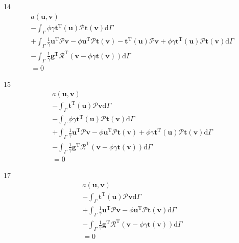 \documentclass[a4paper,12pt]{article}
\begin{document}
14
\begin{equation}
\begin{split}
a(\mathbf{u},\mathbf{v})
\\-
\int_\Gamma
\phi\gamma\mathbf{t}^{\textrm{T}}(\mathbf{u})\mathcal{P}\mathbf{t}(\mathbf{v})
\textrm{d}\Gamma
\\+
\int_\Gamma
\frac{1}{\gamma}
\mathbf{u}^\textrm{T}\mathcal{P}\mathbf{v}
-
\phi\mathbf{u}^\textrm{T}\mathcal{P}\mathbf{t}(\mathbf{v})
-
\mathbf{t}^\textrm{T}(\mathbf{u})\mathcal{P}\mathbf{v}
+
\phi\gamma\mathbf{t}^\textrm{T}(\mathbf{u})\mathcal{P}\mathbf{t}(\mathbf{v})
\textrm{d}\Gamma
\\-
\int_\Gamma
\frac{1}{\gamma}
\mathbf{g}^\textrm{T}\mathcal{R}^\textrm{T}
(\mathbf{v}-\phi\gamma\mathbf{t}(\mathbf{v}))
\textrm{d}\Gamma
\\=
0
\end{split}
\end{equation}

15
\begin{equation}
\begin{split}
a(\mathbf{u},\mathbf{v})
\\-
\int_\Gamma
\mathbf{t}^\textrm{T}(\mathbf{u})\mathcal{P}\mathbf{v}
\textrm{d}\Gamma
\\-
\int_\Gamma
\phi\gamma\mathbf{t}^{\textrm{T}}(\mathbf{u})\mathcal{P}\mathbf{t}(\mathbf{v})
\textrm{d}\Gamma
\\+
\int_\Gamma
\frac{1}{\gamma}
\mathbf{u}^\textrm{T}\mathcal{P}\mathbf{v}
-
\phi\mathbf{u}^\textrm{T}\mathcal{P}\mathbf{t}(\mathbf{v})
+
\phi\gamma\mathbf{t}^\textrm{T}(\mathbf{u})\mathcal{P}\mathbf{t}(\mathbf{v})
\textrm{d}\Gamma
\\-
\int_\Gamma
\frac{1}{\gamma}
\mathbf{g}^\textrm{T}\mathcal{R}^\textrm{T}
(\mathbf{v}-\phi\gamma\mathbf{t}(\mathbf{v}))
\textrm{d}\Gamma
\\=
0
\end{split}
\end{equation}

17
\begin{equation}
\begin{split}
a(\mathbf{u},\mathbf{v})
\\-
\int_\Gamma
\mathbf{t}^\textrm{T}(\mathbf{u})\mathcal{P}\mathbf{v}
\textrm{d}\Gamma
\\+
\int_\Gamma
\frac{1}{\gamma}
\mathbf{u}^\textrm{T}\mathcal{P}\mathbf{v}
-
\phi\mathbf{u}^\textrm{T}\mathcal{P}\mathbf{t}(\mathbf{v})
\textrm{d}\Gamma
\\-
\int_\Gamma
\frac{1}{\gamma}
\mathbf{g}^\textrm{T}\mathcal{R}^\textrm{T}
(\mathbf{v}-\phi\gamma\mathbf{t}(\mathbf{v}))
\textrm{d}\Gamma
\\=
0
\end{split}
\end{equation}
\end{document}
